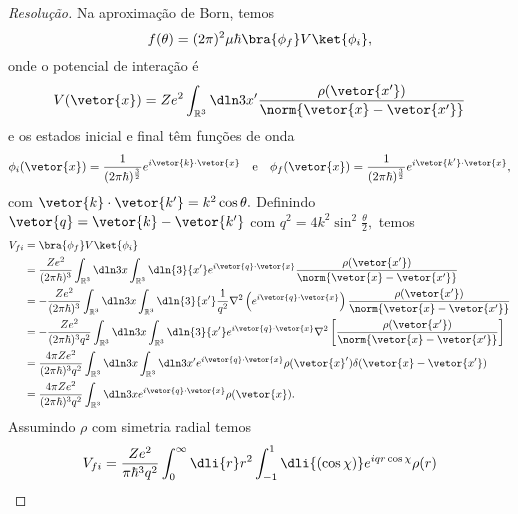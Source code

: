 \begin{proof}[Resolução]
   Na aproximação de Born, temos
   \begin{equation*}
      f(\theta) = (2\pi)^2 \mu \hbar \bra{\phi_f}V\ket{\phi_i},
   \end{equation*}
   onde o potencial de interação é
   \begin{equation*}
      V(\vetor{x}) = Ze^2 \int_{\mathbb{R}^3} \dln3{x'}\frac{\rho(\vetor{x'})}{\norm{\vetor{x} - \vetor{x'}}}
   \end{equation*}
   e os estados inicial e final têm funções de onda
   \begin{equation*}
      \phi_i(\vetor{x}) = \frac{1}{(2\pi \hbar)^{\frac32}}e^{i\vetor{k}\cdot \vetor{x}}
      \quad\text{e}\quad
      \phi_f(\vetor{x}) = \frac{1}{(2\pi \hbar)^{\frac32}}e^{i\vetor{k'}\cdot \vetor{x}},
   \end{equation*}
   com \(\vetor{k}\cdot\vetor{k'} = k^2 \cos\theta.\) Definindo \(\vetor{q} = \vetor{k} - \vetor{k'}\) com \(q^2 = 4k^2 \sin^2\frac\theta2,\) temos
   \begin{align*}
      V_{fi} &= \bra{\phi_f}V\ket{\phi_i}\\
             &= \frac{Ze^2}{(2\pi \hbar)^3}\int_{\mathbb{R}^3} \dln3{x} \int_{\mathbb{R}^3} \dln{3}{x'} e^{i \vetor{q}\cdot\vetor{x}} \frac{\rho(\vetor{x'})}{\norm{\vetor{x} - \vetor{x'}}}\\
             &= -\frac{Ze^2}{(2\pi \hbar)^3}\int_{\mathbb{R}^3} \dln3{x} \int_{\mathbb{R}^3} \dln{3}{x'} \frac{1}{q^2}\nabla^2\left( e^{i \vetor{q}\cdot\vetor{x}}\right)\frac{\rho(\vetor{x'})}{\norm{\vetor{x} - \vetor{x'}}}\\
             &= -\frac{Ze^2}{(2\pi \hbar)^3q^2}\int_{\mathbb{R}^3} \dln3{x} \int_{\mathbb{R}^3} \dln{3}{x'} e^{i \vetor{q}\cdot\vetor{x}}\nabla^2\left[\frac{\rho(\vetor{x'})}{\norm{\vetor{x} - \vetor{x'}}}\right]\\
             &= \frac{4\pi Ze^2}{(2\pi \hbar)^3q^2} \int_{\mathbb{R}^3} \dln3{x} \int_{\mathbb{R}^3} \dln3{x'} e^{i\vetor{q}\cdot\vetor{x}} \rho(\vetor{x}') \delta(\vetor{x} - \vetor{x'})\\
             &= \frac{4\pi Ze^2}{(2\pi \hbar)^3q^2} \int_{\mathbb{R}^3} \dln3{x}  e^{i\vetor{q}\cdot\vetor{x}} \rho(\vetor{x}).
   \end{align*}
   Assumindo \(\rho\) com simetria radial temos
   \begin{align*}
      V_{fi} &= \frac{Ze^2}{\pi \hbar^3 q^2} \int_{0}^\infty \dli{r} r^2 \int_{-1}^{1} \dli{(\cos \chi)} e^{i q r \cos\chi} \rho(r)\\

\end{align*}
\end{proof}
